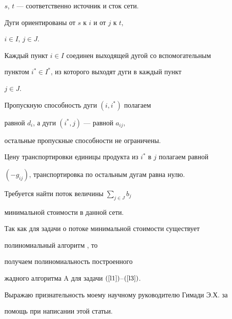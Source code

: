 \begin{pf}
$s$, $t$ --- соответственно источник и сток сети.


Дуги ориентированы от $s$ к $i$ и от $j$ к $t$, 


$i \in I$, $j \in J$.


Каждый пункт $i \in I$ соединен выходящей дугой со вспомогательным


пунктом $i^* \in I^*$, из которого выходят дуги в каждый пункт


$j \in J$.


Пропускную способность дуги $(i, i^*)$ полагаем 


равной $d_i$, а дуги $( i^*, j)$ --- равной $a_{ij}$, 


остальные пропускные способности не ограничены.


Цену транспортировки единицы продукта из $i^*$ в $j$ полагаем равной 


$(-g_{ij})$, транспортировка по остальным дугам равна нулю.


Требуется найти поток величины $\sum\limits_{j \in J} b_j$ 


минимальной стоимости в данной сети.





Так как для задачи о потоке минимальной стоимости существует


полиномиальный алгоритм \cite{O93}, то


получаем полиномиальность построенного


жадного алгоритма A для задачи $(\ref{l1})$--$(\ref{l3})$.


\end{pf}





Выражаю признательность моему научному руководителю Гимади Э.Х. за 


помощь при написании этой статьи.





